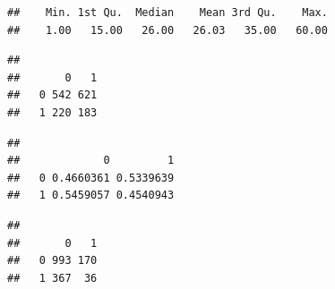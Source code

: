 \documentclass[
  10pt,
]{book}
\newenvironment{Shaded}{\begin{snugshade}}{\end{snugshade}}
\newcommand{\DecValTok}[1]{\textcolor[rgb]{0.00,0.00,0.81}{#1}}
\newcommand{\FunctionTok}[1]{\textcolor[rgb]{0.00,0.00,0.00}{#1}}
\newcommand{\NormalTok}[1]{#1}
\newcommand{\SpecialCharTok}[1]{\textcolor[rgb]{0.00,0.00,0.00}{#1}}
\begin{document}
\begin{verbatim}
##    Min. 1st Qu.  Median    Mean 3rd Qu.    Max. 
##    1.00   15.00   26.00   26.03   35.00   60.00
\end{verbatim}

\begin{Shaded}
\end{Shaded}

\begin{verbatim}
##    
##       0   1
##   0 542 621
##   1 220 183
\end{verbatim}

\begin{Shaded}
\end{Shaded}

\begin{verbatim}
##    
##             0         1
##   0 0.4660361 0.5339639
##   1 0.5459057 0.4540943
\end{verbatim}

\begin{Shaded}
\end{Shaded}

\begin{verbatim}
##    
##       0   1
##   0 993 170
##   1 367  36
\end{verbatim}

\begin{Shaded}
\end{Shaded}
\end{document}
